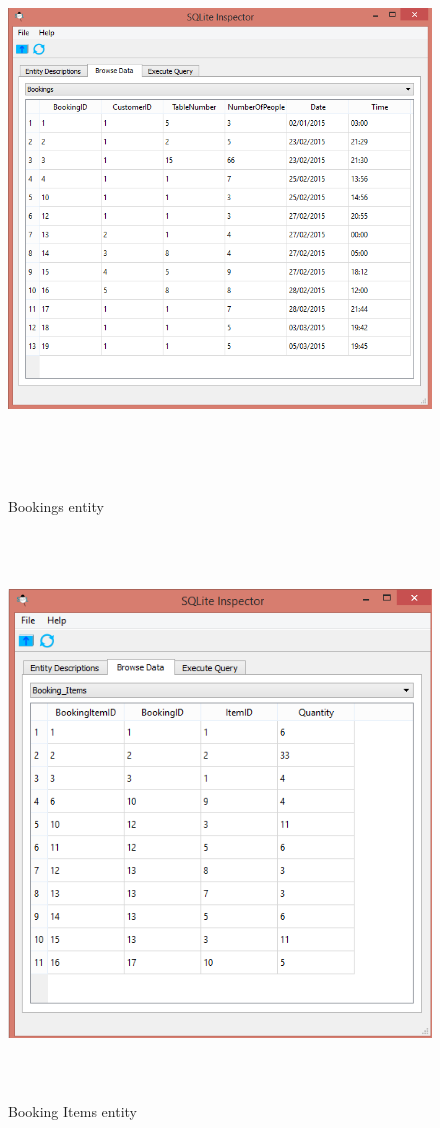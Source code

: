 \begin{figure}[H]
    \includegraphics[height = 15cm]{./Maintenance/images/bookings}
    \caption{Bookings entity} \label{fig:bookings}
\end{figure}

\begin{figure}[H]
    \includegraphics[height = 15cm]{./Maintenance/images/bookingitems}
    \caption{Booking Items entity} \label{fig:bookingitems}
\end{figure}

